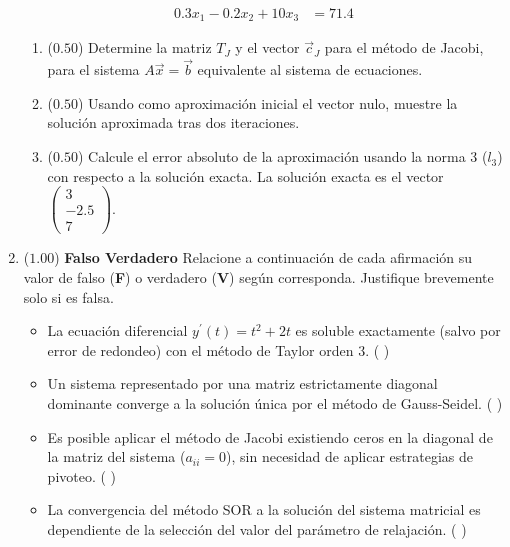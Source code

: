 \documentclass[12pt]{article}
\begin{document}
\begin{enumerate}[leftmargin=*,widest=9]
\begin{align*}
    0.3x_1 - 0.2x_2 + 10x_3 & = 71.4
    \end{align*}
    \begin{enumerate}[label=\alph*]
    \item ($0.50$) Determine la matriz \(T_J\) y el vector \(\vec{c}_J\) para el método de Jacobi, para el sistema \(A\vec{x}=\vec{b}\) equivalente al sistema de ecuaciones.
    \vspace{2cm}
    \item ($0.50$) Usando como aproximación inicial el vector nulo, muestre la solución aproximada tras dos iteraciones.
    \vspace{5cm}
    \item ($0.50$) Calcule el error absoluto de la aproximación usando la norma 3 (\(l_3\)) con respecto a la solución exacta. La solución exacta es el vector
    \( \begin{pmatrix} 3 \\ -2.5 \\ 7 \end{pmatrix} \).
    \vspace{4cm}
    \end{enumerate}
    \item ($1.00$) \textbf{Falso Verdadero} Relacione a continuación de cada afirmación su valor de falso (\textbf{F}) o verdadero (\textbf{V}) según corresponda. Justifique brevemente solo si es falsa.
    \begin{itemize}
    \item La ecuación diferencial \(y^{\prime}(t)= t^2 + 2t\) es soluble exactamente (salvo por error de redondeo) con el método de Taylor orden 3. ( )
    \vspace{1cm}
    \item Un sistema representado por una matriz estrictamente diagonal dominante converge a la solución única por el método de Gauss-Seidel. ( )
    \vspace{1cm}
    \item Es posible aplicar el método de Jacobi existiendo ceros en la diagonal de la matriz del sistema (\(a_{ii}=0\)), sin necesidad de aplicar estrategias de pivoteo. ( )
    \vspace{1cm}
    \item La convergencia del método SOR a la solución del sistema matricial es dependiente de la selección del valor del parámetro de relajación. ( )
    \end{itemize}
  \end{enumerate}
\end{document}
